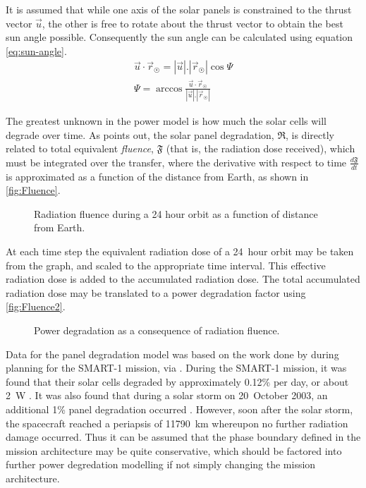 It is assumed that while one axis of the solar panels is constrained to the thrust vector $\vec{u}$, the other is free to rotate about the thrust vector to obtain the best sun angle possible. Consequently the sun angle can be calculated using equation \eqref{eq:sun-angle}.
\begin{subequations}
\begin{gather} \label{eq:sun-angle}
\vec{u}\cdot\vec{r}_\Sun = |\vec{u}|.|\vec{r}_\Sun|\cos\Psi \\
\Psi = \arccos\frac{\vec{u}\cdot\vec{r}_\Sun}{|\vec{u}|.|\vec{r}_\Sun|}
\end{gather}
\end{subequations}

The greatest unknown in the power model is how much the solar cells will degrade over time. As \textcite{Erb_thesis} points out, the solar panel degradation, $\mathfrak{R}$, is directly related to total equivalent \emph{fluence}, $\mathfrak{F}$ (that is, the radiation dose received), which must be integrated over the transfer, where the derivative with respect to time $\frac{d\mathfrak{F}}{dt}$ is approximated as a function of the distance from Earth, as shown in \autoref{fig:Fluence}. 

\begin{figure}
\caption{Radiation fluence during a 24 hour orbit as a function of distance from Earth.} \label{fig:Fluence}
\centering
\def\svgwidth{\figurewidth}

\end{figure}
  
At each time step the equivalent radiation dose of a 24~hour orbit may be taken from the graph, and scaled to the appropriate time interval. This effective radiation dose is added to the accumulated radiation dose. The total accumulated radiation dose may be translated to a power degradation factor using \autoref{fig:Fluence2}.

\begin{figure}
\caption{Power degradation as a consequence of radiation fluence.} \label{fig:Fluence2}
\centering
\def\svgwidth{\figurewidth}

\end{figure}

Data for the panel degradation model was based on the work done by \textcite{Hechler2002} during planning for the SMART-1 mission, via \textcite{Erb_thesis}. During the SMART-1 mission, it was found that their solar cells degraded by approximately 0.12\% per day, or about 2~W \parencite{Racca5}. It was also found that during a solar storm on 20~October 2003, an additional 1\% panel degradation occurred \parencite{Racca8}. However, soon after the solar storm, the spacecraft reached a periapsis of 11790~km whereupon no further radiation damage occurred. Thus it can be assumed that the phase boundary defined in the mission architecture may be quite conservative, which should be factored into further power degredation modelling if not simply changing the mission architecture.

